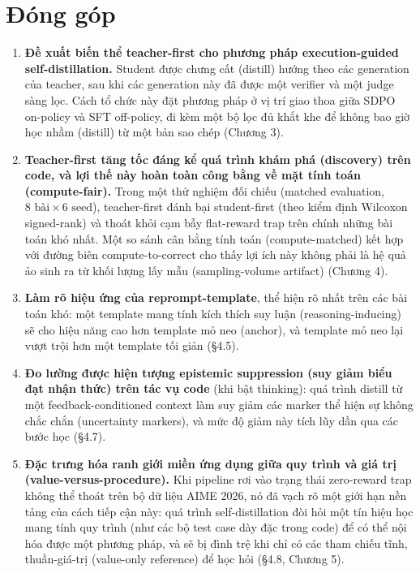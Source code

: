 \section{Đóng góp}\label{contributions}

\begin{enumerate}
\def\labelenumi{\arabic{enumi}.}
\tightlist
\item
  \textbf{Đề xuất biến thể teacher-first cho phương pháp execution-guided self-distillation.} Student được chưng cất (distill) hướng theo các generation của teacher, sau khi các generation này đã được một verifier và một judge sàng lọc. Cách tổ chức này đặt phương pháp ở vị trí giao thoa giữa SDPO on-policy và SFT off-policy, đi kèm một bộ lọc đủ khắt khe để không bao giờ học nhầm (distill) từ một bản sao chép (Chương 3).
\item
  \textbf{Teacher-first tăng tốc đáng kể quá trình khám phá (discovery) trên code, và lợi thế này hoàn toàn công bằng về mặt tính toán (compute-fair).} Trong một thử nghiệm đối chiếu (matched evaluation, $8\text{ bài} \times 6\text{ seed}$), teacher-first đánh bại student-first (theo kiểm định Wilcoxon signed-rank) và thoát khỏi cạm bẫy flat-reward trap trên chính những bài toán khó nhất. Một so sánh cân bằng tính toán (compute-matched) kết hợp với đường biên compute-to-correct cho thấy lợi ích này không phải là hệ quả ảo sinh ra từ khối lượng lấy mẫu (sampling-volume artifact) (Chương 4).
\item
  \textbf{Làm rõ hiệu ứng của reprompt-template}, thể hiện rõ nhất trên các bài toán khó: một template mang tính kích thích suy luận (reasoning-inducing) sẽ cho hiệu năng cao hơn template mỏ neo (anchor), và template mỏ neo lại vượt trội hơn một template tối giản (§4.5).
\item
  \textbf{Đo lường được hiện tượng epistemic suppression (suy giảm biểu đạt nhận thức) trên tác vụ code} (khi bật thinking): quá trình distill từ một feedback-conditioned context làm suy giảm các marker thể hiện sự không chắc chắn (uncertainty markers), và mức độ giảm này tích lũy dần qua các bước học (§4.7).
\item
  \textbf{Đặc trưng hóa ranh giới miền ứng dụng giữa quy trình và giá trị (value-versus-procedure).} Khi pipeline rơi vào trạng thái zero-reward trap không thể thoát trên bộ dữ liệu AIME 2026, nó đã vạch rõ một giới hạn nền tảng của cách tiếp cận này: quá trình self-distillation đòi hỏi một tín hiệu học mang tính quy trình (như các bộ test case dày đặc trong code) để có thể nội hóa được một phương pháp, và sẽ bị đình trệ khi chỉ có các tham chiếu tĩnh, thuần-giá-trị (value-only reference) để học hỏi (§4.8, Chương 5).
\end{enumerate}

